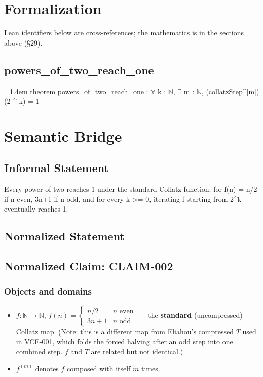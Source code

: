 \documentclass[11pt]{article}
\begin{document}
\section{Formalization}
Lean identifiers below are cross-references; the mathematics is in the sections above (\S{}29).
\subsection*{powers\_of\_two\_reach\_one}
{\footnotesize\ttfamily\raggedright\hangindent=1.4em\noindent
\hspace*{0.00em}theorem powers\_\allowbreak{}of\_\allowbreak{}two\_\allowbreak{}reach\_\allowbreak{}one : \ensuremath{\forall} k : \ensuremath{\mathbb{N}}, \ensuremath{\exists} m : \ensuremath{\mathbb{N}}, (collatzStep\textasciicircum{}[m]) (2 \textasciicircum{} k) = 1\par
}

\section{Semantic Bridge}
\subsection*{Informal Statement}
Every power of two reaches 1 under the standard Collatz function: for f(n) = n/2 if n even, 3n+1 if n odd, and for every k >= 0, iterating f starting from 2\textasciicircum{}k eventually reaches 1.
\subsection*{Normalized Statement}
\subsection*{Normalized Claim: CLAIM-002}
\subsubsection*{Objects and domains}
\begin{itemize}
\item $f : \mathbb{N} \to \mathbb{N}$, $f(n) = \begin{cases} n/2 & n \text{ even} \\ 3n+1 & n \text{ odd} \end{cases}$ --- the \textbf{standard} (uncompressed) Collatz map. (Note: this is a different map from Eliahou's compressed $T$ used in VCE-001, which folds the forced halving after an odd step into one combined step. $f$ and $T$ are related but not identical.)
\item $f^{(m)}$ denotes $f$ composed with itself $m$ times.
\end{itemize}
\end{document}

